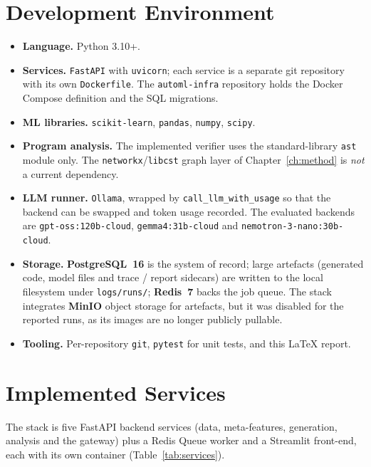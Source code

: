 \section{Development Environment}

\begin{itemize}
\raggedright
    \item \textbf{Language.} Python 3.10+.
    \item \textbf{Services.} \texttt{FastAPI} with \texttt{uvicorn};
    each service is a separate git repository with its own
    \texttt{Dockerfile}. The \texttt{automl-infra} repository holds
    the Docker Compose definition and the SQL migrations.
    \item \textbf{ML libraries.} \texttt{scikit-learn},
    \texttt{pandas}, \texttt{numpy}, \texttt{scipy}.
    \item \textbf{Program analysis.} The implemented verifier uses the
    standard-library \texttt{ast} module only. The
    \texttt{networkx}/\texttt{libcst} graph layer of
    Chapter~\ref{ch:method} is \emph{not} a current dependency.
    \item \textbf{LLM runner.} \texttt{Ollama}, wrapped by
    \texttt{call\_llm\_with\_usage} so that the backend can be swapped
    and token usage recorded. The evaluated backends are
    \texttt{gpt-oss:120b-cloud}, \texttt{gemma4:31b-cloud} and
    \texttt{nemotron-3-nano:30b-cloud}.
    \item \textbf{Storage.} \textbf{PostgreSQL~16} is the system of
    record; large artefacts (generated code, model files and trace /
    report sidecars) are written to the local filesystem under
    \texttt{logs/runs/}; \textbf{Redis~7} backs the job queue. The
    stack integrates \textbf{MinIO} object storage for artefacts, but
    it was disabled for the reported runs, as its images are no longer
    publicly pullable.
    \item \textbf{Tooling.} Per-repository \texttt{git}, \texttt{pytest}
    for unit tests, and this \LaTeX{} report.
\end{itemize}

\section{Implemented Services}

The stack is five FastAPI backend services (data, meta-features,
generation, analysis and the gateway) plus a Redis Queue worker and a
Streamlit front-end, each with its own container (Table~\ref{tab:services}).

